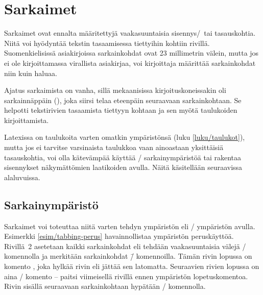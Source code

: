 \section{Sarkaimet}
\label{luku/sarkaimet}

Sarkaimet ovat ennalta määritettyjä vaakasuuntaisia sisennys\-/\ tai
tasauskohtia. Niitä voi hyödyntää tekstin tasaamisessa tiettyihin
kohtiin rivillä. Suomenkielisissä asiakirjoissa sarkainkohdat ovat 23
millimetrin välein, mutta jos ei ole kirjoittamassa virallista
asiakirjaa, voi kirjoittaja määrittää sarkainkohdat niin kuin haluaa.

Ajatus sarkaimista on vanha, sillä mekaanisissa kirjoituskoneissakin oli
sarkainnäppäin (), joka siirsi telaa eteenpäin
seuraavaan sarkainkohtaan. Se helpotti tekstirivien tasaamista tiettyyn
kohtaan ja sen myötä taulukoiden kirjoittamista.

Latexissa on taulukoita varten omatkin ympäristönsä (luku
\ref{luku/taulukot}), mutta jos ei tarvitse varsinaista taulukkoa vaan
ainoastaan yksittäisiä tasauskohtia, voi olla kätevämpää käyttää
\-/ sarkainympäristöä tai rakentaa sisennykset
näkymättömien laatikoiden avulla. Näitä käsitellään seuraavissa
alaluvuissa.

\subsection{Sarkainympäristö}

Sarkaimet voi toteuttaa niitä varten tehdyn ympäristön eli
\-/ ympäristön avulla. Esimerkki
\ref{esim/tabbing-perus} havainnollistaa ympäristön peruskäyttöä.
Rivillä~2 asetetaan kaikki sarkainkohdat eli tehdään vaakasuuntaisia
välejä \-/ komennolla ja merkitään sarkainkohdat
\komento{=}\=/ komennoilla. Tämän rivin lopussa on komento
, joka hylkää rivin eli jättää sen latomatta. Seuraavien
rivien lopussa on aina \komento{\keno}\-/ komento -- paitsi viimeisellä
rivillä ennen ympäristön lopetuskomentoa. Rivin sisällä seuraavaan
sarkainkohtaan hypätään \komento{>}\-/ komennolla.

